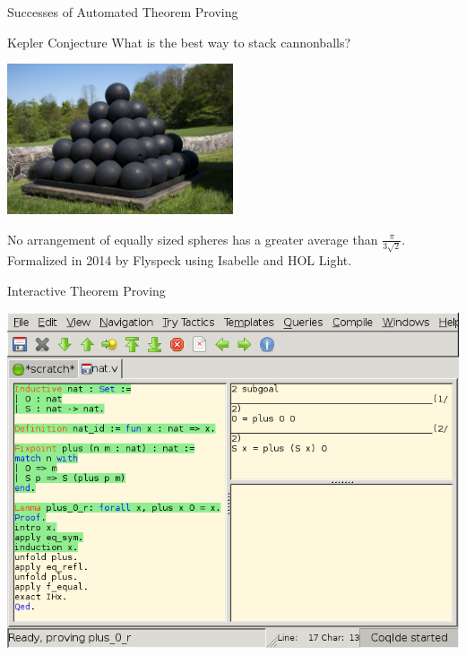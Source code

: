 \documentclass[department=ds, notes={hide notes}, slidesperpage=1]{beamerruhuisstijl}
\begin{document}
\begin{frame}{Successes of Automated Theorem Proving}
	\begin{block}{Kepler Conjecture}
		What is the best way to stack cannonballs?
		\bigskip
		\begin{center}
				\includegraphics[width=0.5\textwidth]{figures/balls.jpg}\\
				\centering \color{gray}{Nedral (CC by-nc-sa 2.5)}
		\end{center}
		
		\small{
				No arrangement of equally sized spheres has a greater average than $\frac{\pi}{3\sqrt{2}}$.
				Formalized in 2014 by Flyspeck using Isabelle and HOL Light.
		}
	\end{block}
\end{frame}

\begin{frame}{Interactive Theorem Proving}
	\begin{center}
		\includegraphics[height=0.78\textheight]{figures/coqide.png}
	\end{center}
\end{frame}
\end{document}
